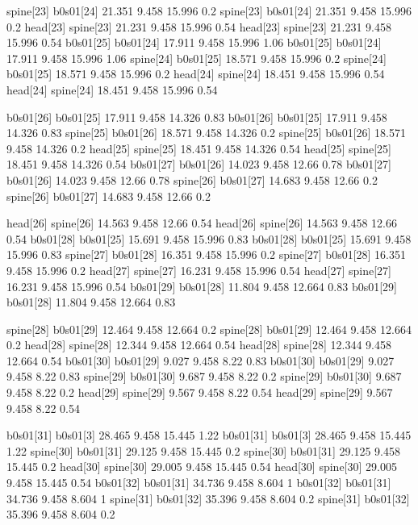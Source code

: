 spine[23]    b0s01[24]    21.351    9.458    15.996    0.2
spine[23]    b0s01[24]    21.351    9.458    15.996    0.2
head[23]    spine[23]    21.231    9.458    15.996    0.54
head[23]    spine[23]    21.231    9.458    15.996    0.54
b0s01[25]    b0s01[24]    17.911    9.458    15.996    1.06
b0s01[25]    b0s01[24]    17.911    9.458    15.996    1.06
spine[24]    b0s01[25]    18.571    9.458    15.996    0.2
spine[24]    b0s01[25]    18.571    9.458    15.996    0.2
head[24]    spine[24]    18.451    9.458    15.996    0.54
head[24]    spine[24]    18.451    9.458    15.996    0.54


b0s01[26]    b0s01[25]    17.911    9.458    14.326    0.83
b0s01[26]    b0s01[25]    17.911    9.458    14.326    0.83
spine[25]    b0s01[26]    18.571    9.458    14.326    0.2
spine[25]    b0s01[26]    18.571    9.458    14.326    0.2
head[25]    spine[25]    18.451    9.458    14.326    0.54
head[25]    spine[25]    18.451    9.458    14.326    0.54
b0s01[27]    b0s01[26]    14.023    9.458    12.66    0.78
b0s01[27]    b0s01[26]    14.023    9.458    12.66    0.78
spine[26]    b0s01[27]    14.683    9.458    12.66    0.2
spine[26]    b0s01[27]    14.683    9.458    12.66    0.2


head[26]    spine[26]    14.563    9.458    12.66    0.54
head[26]    spine[26]    14.563    9.458    12.66    0.54
b0s01[28]    b0s01[25]    15.691    9.458    15.996    0.83
b0s01[28]    b0s01[25]    15.691    9.458    15.996    0.83
spine[27]    b0s01[28]    16.351    9.458    15.996    0.2
spine[27]    b0s01[28]    16.351    9.458    15.996    0.2
head[27]    spine[27]    16.231    9.458    15.996    0.54
head[27]    spine[27]    16.231    9.458    15.996    0.54
b0s01[29]    b0s01[28]    11.804    9.458    12.664    0.83
b0s01[29]    b0s01[28]    11.804    9.458    12.664    0.83


spine[28]    b0s01[29]    12.464    9.458    12.664    0.2
spine[28]    b0s01[29]    12.464    9.458    12.664    0.2
head[28]    spine[28]    12.344    9.458    12.664    0.54
head[28]    spine[28]    12.344    9.458    12.664    0.54
b0s01[30]    b0s01[29]    9.027    9.458    8.22    0.83
b0s01[30]    b0s01[29]    9.027    9.458    8.22    0.83
spine[29]    b0s01[30]    9.687    9.458    8.22    0.2
spine[29]    b0s01[30]    9.687    9.458    8.22    0.2
head[29]    spine[29]    9.567    9.458    8.22    0.54
head[29]    spine[29]    9.567    9.458    8.22    0.54


b0s01[31]    b0s01[3]    28.465    9.458    15.445    1.22
b0s01[31]    b0s01[3]    28.465    9.458    15.445    1.22
spine[30]    b0s01[31]    29.125    9.458    15.445    0.2
spine[30]    b0s01[31]    29.125    9.458    15.445    0.2
head[30]    spine[30]    29.005    9.458    15.445    0.54
head[30]    spine[30]    29.005    9.458    15.445    0.54
b0s01[32]    b0s01[31]    34.736    9.458    8.604    1
b0s01[32]    b0s01[31]    34.736    9.458    8.604    1
spine[31]    b0s01[32]    35.396    9.458    8.604    0.2
spine[31]    b0s01[32]    35.396    9.458    8.604    0.2


